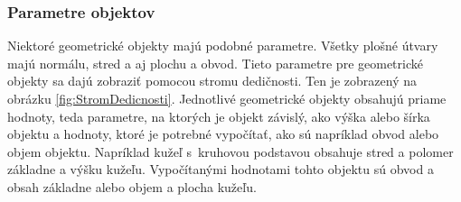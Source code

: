 \subsubsection*{Parametre objektov}





Niektoré geometrické objekty majú podobné parametre. Všetky plošné útvary majú normálu, stred a aj plochu a obvod. 
Tieto parametre pre geometrické objekty sa dajú zobraziť pomocou stromu dedičnosti. Ten je zobrazený na obrázku \ref{fig:StromDedicnosti}.  Jednotlivé geometrické objekty obsahujú priame hodnoty, teda parametre, na ktorých je objekt závislý, ako výška alebo šírka objektu a hodnoty, ktoré je potrebné vypočítať, ako sú napríklad obvod alebo objem objektu. Napríklad kužeľ s~kruhovou podstavou obsahuje stred a polomer základne a výšku kužeľu. Vypočítanými hodnotami tohto objektu sú obvod a obsah základne alebo objem a plocha kužeľu.  

